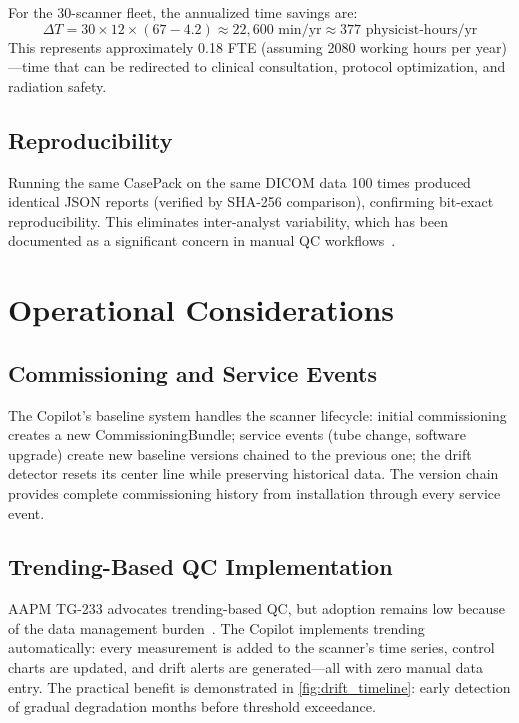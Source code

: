 \documentclass[11pt]{article}
\begin{document}
For the 30-scanner fleet, the annualized time savings are:
\begin{equation}
  \Delta T = 30 \times 12 \times (67 - 4.2) \approx 22{,}600 \text{~min/yr}
  \approx 377 \text{~physicist-hours/yr}
\label{eq:time_savings}
\end{equation}
This represents approximately 0.18 FTE (assuming 2080 working hours
per year)---time that can be redirected to clinical consultation,
protocol optimization, and radiation safety.

\subsection{Reproducibility}

Running the same CasePack on the same DICOM data 100 times produced
identical JSON reports (verified by SHA-256 comparison), confirming
bit-exact reproducibility.
This eliminates inter-analyst variability, which has been documented
as a significant concern in manual QC
workflows~\cite{verdun2015image_quality}.


\section{Operational Considerations}
\label{sec:operations}

\subsection{Commissioning and Service Events}

The Copilot's baseline system handles the scanner lifecycle:
initial commissioning creates a new CommissioningBundle; service
events (tube change, software upgrade) create new baseline versions
chained to the previous one; the drift detector resets its center
line while preserving historical data.
The version chain provides complete commissioning history from
installation through every service event.

\subsection{Trending-Based QC Implementation}

AAPM TG-233 advocates trending-based QC, but adoption remains
low because of the data management
burden~\cite{aapm_tg233,pawlicki2005spc}.
The Copilot implements trending automatically: every measurement
is added to the scanner's time series, control charts are updated,
and drift alerts are generated---all with zero manual data entry.
The practical benefit is demonstrated in \cref{fig:drift_timeline}:
early detection of gradual degradation months before threshold
exceedance.
\end{document}
